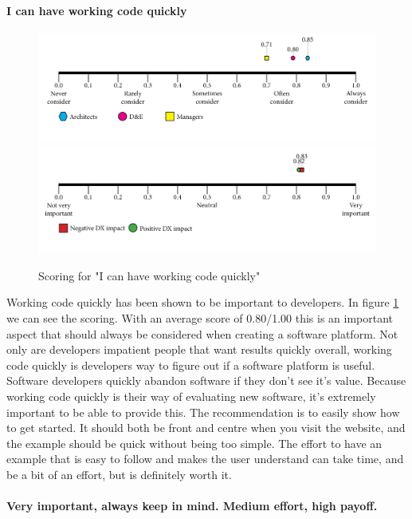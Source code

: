 \documentclass{article}
\begin{document}
\paragraph{I can have working code quickly}
\begin{figure}[H]
\centering
\includegraphics[width=\linewidth]{scorelines/aspect2.png}
\includegraphics[width=\linewidth]{dxscorelines/dxaspect2.png}
\caption{Scoring for "I can have working code quickly"}
\label{fig:aspect2}
\end{figure}
Working code quickly has been shown to be important to developers. In figure \ref{fig:aspect2} we can see the scoring. With an average score of 0.80/1.00 this is an important aspect that should always be considered when creating a software platform. Not only are developers impatient people that want results quickly overall, working code quickly is developers way to figure out if a software platform is useful. Software developers quickly abandon software if they don't see it's value. Because working code quickly is their way of evaluating new software, it's extremely important to be able to provide this. The recommendation is to easily show how to get started. It should both be front and centre when you visit the website, and the example should be quick without being too simple. The effort to have an example that is easy to follow  and makes the user understand can take time, and be a bit of an effort, but is definitely worth it.\\ \\
\textbf{Very important, always keep in mind. Medium effort, high payoff.}
\end{document}
